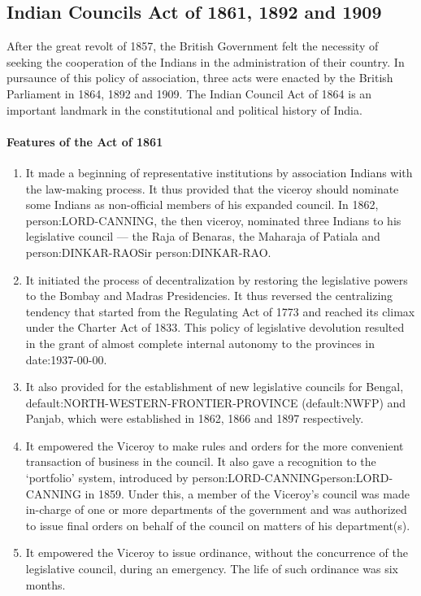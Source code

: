 \begin{multicols}{2}
\subsection{Indian Councils Act of 1861, 1892 and 1909}
After the great revolt of 1857, the British Government felt the necessity of seeking the cooperation of the Indians in the administration of their country. In pursaunce of this policy of association, three acts were enacted by the British Parliament in 1864, 1892 and 1909. The Indian Council Act of 1864 is an important landmark in the constitutional and political history of India.

\paragraph{Features of the Act of 1861}
\begin{enumerate}
  \item It made a beginning of representative institutions by association Indians with the law-making process. It thus provided that the viceroy should nominate some Indians as non-official members of his expanded council. In 1862, \gls{person:LORD-CANNING}, the then viceroy, nominated three Indians to his legislative council — the Raja of Benaras, the Maharaja of Patiala and \gls{person:DINKAR-RAO}Sir \gls{person:DINKAR-RAO}.
  \item It initiated the process of decentralization by restoring the legislative powers to the Bombay and Madras Presidencies. It thus reversed the centralizing tendency that started from the Regulating Act of 1773 and reached its climax under the Charter Act of 1833. This policy of legislative devolution resulted in the grant of almost complete internal autonomy to the provinces in \gls{date:1937-00-00}.
  \item It also provided for the establishment of new legislative councils for Bengal, \gls{default:NORTH-WESTERN-FRONTIER-PROVINCE} (\gls{default:NWFP}) and Panjab, which were established in 1862, 1866 and 1897 respectively.
  \item It empowered the Viceroy to make rules and orders for the more convenient transaction of business in the council. It also gave a recognition to the  `portfolio' system, introduced by \gls{person:LORD-CANNING}\gls{person:LORD-CANNING} in 1859. Under this, a member of the Viceroy's council was made in-charge of one or more departments of the government and was authorized to issue final orders on behalf of the council on matters of his department(s).
  \item It empowered the Viceroy to issue ordinance, without the concurrence of the legislative council, during an emergency. The life of such ordinance was six months.
\end{enumerate}


\end{multicols}
